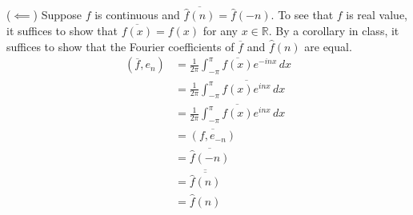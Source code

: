 \documentclass[11pt]{article}
\newcommand{\bbR}{\mathbb{R}}
\begin{document}
\begin{problem}
\begin{enumerate}
\begin{solution}
($\impliedby$) Suppose $f$ is continuous and $\overline{\hat{f}(n)} = \hat{f}(-n).$ To see that $f$ is real value, it suffices to show that $\overline{f(x)} = f(x)$ for any $x\in \bbR.$ By a corollary in class, it suffices to show that the Fourier coefficients of $\overline{f}$ and $\hat{f}(n)$ are equal.
\begin{align*}(\overline{f}, e_n) &= \frac{1}{2\pi}\int_{-\pi}^\pi \overline{f(x)} e^{-inx} \, dx\\
&= \frac{1}{2\pi}\int_{-\pi}^\pi \overline{f(x)e^{inx}}\, dx\\
&= \overline{\frac{1}{2\pi}\int_{-\pi}^\pi {f(x)e^{inx}}\, dx}\\
&= \overline{(f,e_{-n})}\\
&= \overline{\hat{f}(-n)}\\
&= \overline{\overline{\hat{f}(n)}}\\
&= \hat{f}(n)
\end{align*}
\end{solution}
    \end{enumerate}
\end{problem}

\newpage
\end{document}
